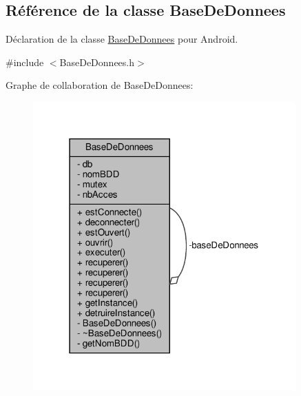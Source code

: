 \hypertarget{class_base_de_donnees}{}\subsection{Référence de la classe Base\+De\+Donnees}
\label{class_base_de_donnees}


Déclaration de la classe \hyperlink{class_base_de_donnees}{Base\+De\+Donnees} pour Android.  




{\ttfamily \#include $<$Base\+De\+Donnees.\+h$>$}



Graphe de collaboration de Base\+De\+Donnees\+:\nopagebreak
\begin{figure}[H]
\begin{center}
\leavevmode
\includegraphics[width=286pt]{class_base_de_donnees__coll__graph}
\end{center}
\end{figure}
